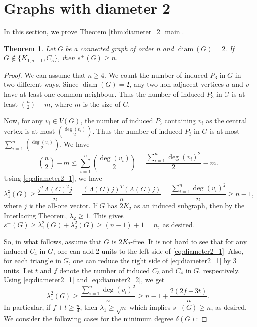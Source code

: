 \documentclass{article}
\newtheorem{theorem}{Theorem}[section]
\DeclareMathOperator{\diam}{diam}
\begin{document}
\section{Graphs with diameter 2}\label{section:diam_2}

In this section, we prove Theorem \ref{thm:diameter_2_main}.  

\begin{theorem}
Let $G$ be a connected graph of order $n$ and $\diam(G)=2$. If $G\not \in \{K_{1,n-1}, C_5\}$, then $s^+(G)\geq n$.
\end{theorem}

\begin{proof} We can assume that $n\geq 4$. We count the number of induced $P_3$ in $G$ in two different ways. Since $\diam(G)=2$, any two non-adjacent vertices $u$ and $v$ have at least one common neighbour. Thus the number of induced $P_3$ in $G$ is at least ${n\choose 2} - m$, where $m$ is the size of $G$.

Now, for any $v_i\in V(G)$, the number of induced $P_3$ containing $v_i$ as the central vertex is at most ${\deg(v_i)}\choose 2$. Thus the number of induced $P_3$ in $G$ is at most $\sum_{i=1}^n {\deg(v_i)\choose 2}$. We have
\begin{equation}\label{eq:diameter2_1}
    {n\choose 2} -m\leq  \sum_{i=1}^n {\deg(v_i)\choose 2}= \frac{\sum_{i=1}^n \deg(v_i)^2}{2}-m.
\end{equation}
Using \eqref{eq:diameter2_1}, we have 
\begin{equation}\label{eq:diameter2_2}
  \lambda_1^2(G)\geq \frac{j^TA(G)^2j}{n}=\frac{(A(G)j)^T(A(G)j)}{n}=\frac{\sum_{i=1}^n \deg(v_i)^2}{n}\geq n-1,  
\end{equation}
where $j$ is the all-one vector. If $G$ has $2K_2$ as an induced subgraph, then by the Interlacing Theorem, $\lambda_2\geq 1$. This gives $s^+(G)\geq \lambda_1^2(G) + \lambda_2^2(G) \ge (n-1)+1=n,$ as desired. 

So, in what follows, assume that $G$ is $2K_2$-free. It is not hard to see that for any induced $C_4$ in $G$, one can add 2 units to the left side of \eqref{eq:diameter2_1}. Also, for each triangle in $G$, one can reduce the right side of \eqref{eq:diameter2_1} by 3 units. Let $t$ and $f$ denote the number of induced $C_3$ and $C_4$ in $G$, respectively. Using \eqref{eq:diameter2_1} and \eqref{eq:diameter2_2}, we get
\begin{equation}\label{eq:diameter2_3}
    \lambda_1^2(G)\geq \frac{\sum_{i=1}^n \deg(v_i)^2}{n}\geq n-1 + \frac{2(2f+3t)}{n}.
\end{equation}
In particular, if $f+t\geq \frac{n}{4}$, then $\lambda_1\geq \sqrt{n}$ which implies $s^+(G)\geq n$, as desired. We consider the following cases for the minimum degree $\delta(G)$:


\end{proof}
\end{document}
